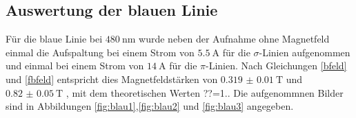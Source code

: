 \subsection{Auswertung der blauen Linie}
Für die blaue Linie bei $\SI{480}{\nano\meter}$  wurde neben der Aufnahme ohne Magnetfeld einmal
die Aufspaltung bei einem Strom von $\SI{5.5}{\ampere}$ für die $\sigma$-Linien aufgenommen
und einmal bei einem Strom von $\SI{14}{\ampere}$ für die $\pi$-Linien. Nach Gleichungen
\ref{bfeld} und \ref{fbfeld} entspricht dies Magnetfeldstärken von $\SI{0.319(10)}{\tesla}$
und $\SI{0.82(5)}{\tesla}$ , mit dem theoretischen Werten ??=1..
Die aufgenommnen Bilder sind in Abbildungen \ref{fig:blau1},\ref{fig:blau2} und \ref{fig:blau3} angegeben.
\begin{figure}
\begin{subfigure}[c]{0.5\textwidth}


\end{subfigure}
\end{figure}
